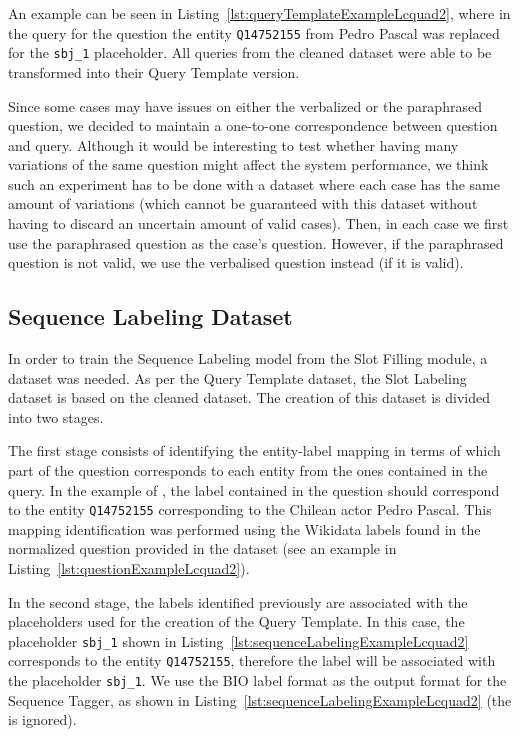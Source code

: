 An example can be seen in Listing~\ref{lst:queryTemplateExampleLcquad2}, where in the \SPARQL{} 
query for the question  the entity \texttt{Q14752155} 
from Pedro Pascal was replaced for the \texttt{sbj\_1} placeholder. All queries from the cleaned dataset 
were able to be transformed into their Query Template version.

Since some cases may have issues on either the verbalized or the paraphrased question, we 
decided to maintain a one-to-one correspondence between question and query. Although it would 
be interesting to test whether having many variations of the same question might affect the 
system performance, we think such an experiment has to be done with a dataset where each case has 
the same amount of variations (which cannot be guaranteed with this dataset without having to 
discard an uncertain amount of valid cases). Then, in each case we first use the paraphrased 
question as the case’s question. However, if the paraphrased question is not valid, we use the 
verbalised question instead (if it is valid).

\subsection{Sequence Labeling Dataset}
\label{cap4:experimentalDesign/QaDataset/seqLabeling}
In order to train the Sequence Labeling model from the Slot Filling module, a dataset was 
needed. As per the Query Template dataset, the Slot Labeling dataset is based on the cleaned 
\LCQuADtwo{} dataset. The creation of this dataset is divided into two stages. 

The first stage consists of identifying the entity-label mapping in terms of which part of the 
question corresponds to each entity from the ones contained in the \SPARQL{} query. In the example 
of , the label  contained in the 
question should correspond to the entity \texttt{Q14752155} corresponding to the Chilean actor Pedro 
Pascal. This mapping identification was performed using the Wikidata labels found in the normalized 
question provided in the \LCQuADtwo dataset (see an example in Listing~\ref{lst:questionExampleLcquad2}).

In the second stage, the labels identified previously are associated with the placeholders used 
for the creation of the Query Template. In this case, the placeholder \texttt{sbj\_1} shown in 
Listing~\ref{lst:sequenceLabelingExampleLcquad2} corresponds to the entity \texttt{Q14752155}, 
therefore the label  will be associated with the placeholder \texttt{sbj\_1}. 
We use the BIO label format as the output format for the Sequence Tagger, as shown in 
Listing~\ref{lst:sequenceLabelingExampleLcquad2} (the  is ignored).

